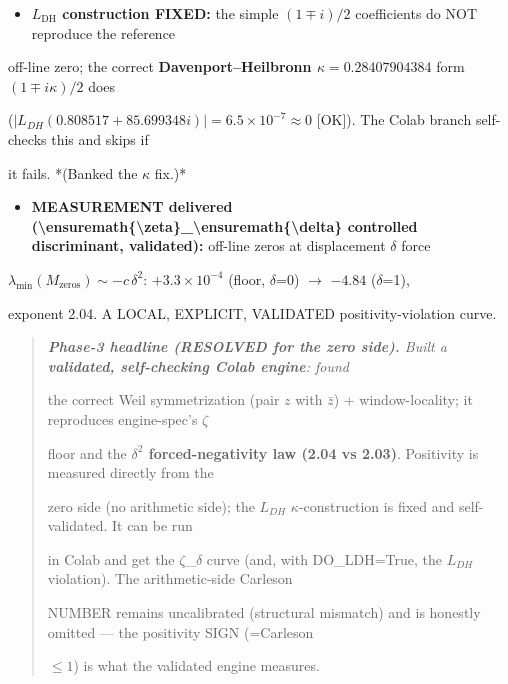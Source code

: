 \documentclass[10pt]{article}
\begin{document}
\begin{itemize}
\item \textbf{$L_{\mathrm{DH}}$ construction FIXED:} the simple $(1\mp i)/2$ coefficients do NOT reproduce the reference
\end{itemize}
  off-line zero; the correct \textbf{Davenport--Heilbronn $\kappa=0.28407904384$} form $(1\mp i\kappa)/2$ does\par
  ($|L_{DH}(0.808517+85.699348i)|=6.5\times10^{-7}\approx0$ [OK]). The Colab branch self-checks this and skips if\par
  it fails. *(Banked the \ensuremath{\kappa} fix.)*\par
\begin{itemize}
\item \textbf{MEASUREMENT delivered (\textbackslash{}ensuremath\{\textbackslash{}zeta\}\_\textbackslash{}ensuremath\{\textbackslash{}delta\} controlled discriminant, validated):} off-line zeros at displacement \ensuremath{\delta} force
\end{itemize}
  $\lambda_{\min}(M_{\mathrm{zeros}})\sim-c\,\delta^2$: $+3.3\times10^{-4}$ (floor, \ensuremath{\delta}=0) \ensuremath{\to} $-4.84$ (\ensuremath{\delta}=1),\par
  exponent 2.04. A LOCAL, EXPLICIT, VALIDATED positivity-violation curve.\par

\begin{quote}\itshape
\textbf{Phase-3 headline (RESOLVED for the zero side).} Built a \textbf{validated, self-checking Colab engine}: found\par
the correct Weil symmetrization (pair $z$ with $\bar z$) + window-locality; it reproduces engine-spec's \ensuremath{\zeta}\par
floor and the \textbf{$\delta^2$ forced-negativity law (2.04 vs 2.03)}. Positivity is measured directly from the\par
zero side (no arithmetic side); the $L_{DH}$ \ensuremath{\kappa}-construction is fixed and self-validated. It can be run\par
in Colab and get the \ensuremath{\zeta}\_\ensuremath{\delta} curve (and, with DO\_LDH=True, the $L_{DH}$ violation). The arithmetic-side Carleson\par
NUMBER remains uncalibrated (structural mismatch) and is honestly omitted --- the positivity SIGN (=Carleson\par
$\le1$) is what the validated engine measures.\par
\end{quote}
\end{document}
